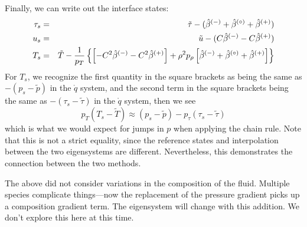 Finally, we can write out the interface states:
\begin{eqnarray}
\tau_s &=& \tilde{\tau} - (\hat{\beta}^\evm + \hat{\beta}^\evz + \hat{\beta}^\evp) \\
%
u_s &=& \tilde{u} - (C \hat{\beta}^\evm - C \hat{\beta}^\evp) \\
%
T_s &=& \tilde{T} - \frac{1}{p_T} \left \{
   \left [ -C^2 \hat{\beta}^\evm - C^2 \hat{\beta}^\evp \right ] +
   \rho^2 p_\rho \left [ \hat{\beta}^\evm + \hat{\beta}^\evz + \hat{\beta}^\evp \right ] \right \}
\end{eqnarray}
For $T_s$, we recognize the first quantity in the square brackets as
being the same as $-(p_s - \tilde{p})$ in the $\mathring{q}$ system, and the
second term in the square brackets being the same as $-(\tau_s - \tilde{\tau})$
in the $\mathring{q}$ system, then we see
\begin{equation}
p_T (T_s - \tilde{T} ) \approx (p_s - \tilde{p} ) - p_\tau (\tau_s - \tilde{\tau})
\end{equation}
which is what we would expect for jumps in $p$ when applying the chain
rule.  Note that this is not a strict equality, since the reference
states and interpolation between the two eigensystems are different.
Nevertheless, this demonstrates the connection between the two
methods.

The above did not consider variations in the composition of the fluid.
Multiple species complicate things---now the replacement of the
pressure gradient picks up a composition gradient term.
The eigensystem will change with this addition.  We don't explore this here at this
time.
\fi

